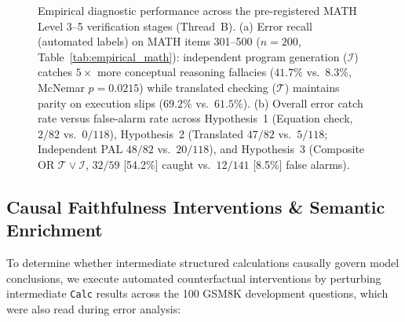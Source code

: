 \documentclass[11pt,a4paper]{article}
\begin{document}
\begin{figure}[t]
\begin{minipage}[t]{0.47\textwidth}
\end{minipage}
\caption{Empirical diagnostic performance across the pre-registered MATH Level 3--5 verification stages (Thread~B). (a) Error recall (automated labels) on MATH items 301--500 ($n=200$, Table~\ref{tab:empirical_math}): independent program generation ($\mathcal{I}$) catches $5\times$ more conceptual reasoning fallacies ($41.7\%$ vs.\ $8.3\%$, McNemar $p=0.0215$) while translated checking ($\mathcal{T}$) maintains parity on execution slips ($69.2\%$ vs.\ $61.5\%$). (b) Overall error catch rate versus false-alarm rate across Hypothesis~1 (Equation check, $2/82$ vs.\ $0/118$), Hypothesis~2 (Translated $47/82$ vs.\ $5/118$; Independent PAL $48/82$ vs.\ $20/118$), and Hypothesis~3 (Composite OR $\mathcal{T} \lor \mathcal{I}$, $32/59$ [54.2\%] caught vs.\ $12/141$ [8.5\%] false alarms).}
\label{fig:checker_tradeoff}
\end{figure}

\subsection{Causal Faithfulness Interventions \& Semantic Enrichment}
\label{sec:causal_interventions}

To determine whether intermediate structured calculations causally govern model conclusions, we execute automated counterfactual interventions by perturbing intermediate \texttt{Calc} results across the 100 GSM8K development questions, which were also read during error analysis:
\end{document}
